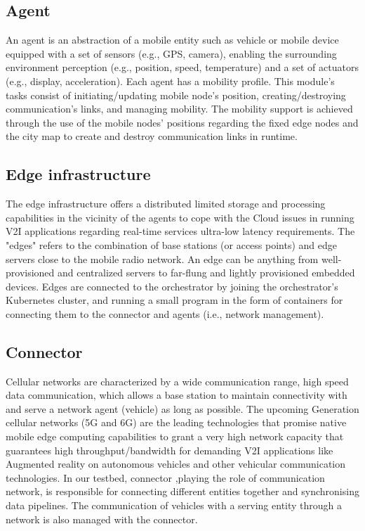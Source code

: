 \documentclass[conference]{IEEEtran}
\begin{document}
\subsection{Agent}
\par An agent is an abstraction of a mobile entity such as vehicle or mobile device equipped with a set of sensors (e.g., GPS, camera), enabling the surrounding environment perception (e.g., position, speed, temperature) and a set of actuators (e.g., display, acceleration). Each agent has a mobility profile. This module's tasks consist of initiating/updating mobile node's position, creating/destroying communication's links, and managing mobility.
The mobility support is achieved through the use of the mobile nodes' positions regarding the fixed edge nodes and the city map to create and destroy communication links in runtime.
\subsection{Edge infrastructure}
\par The edge infrastructure offers a distributed limited storage and processing capabilities in the vicinity of the agents to cope with the Cloud issues in running V2I applications regarding real-time services ultra-low latency requirements. The "edges" refers to the combination of base stations (or access points) and edge servers close to the mobile radio network. An edge can be anything from well-provisioned and centralized servers to far-flung and lightly provisioned embedded devices. Edges are connected to the orchestrator by joining the orchestrator's Kubernetes cluster, and running a small program in the form of containers for connecting them to the connector and agents (i.e., network management).
\subsection{Connector} 
\par Cellular networks are characterized by a wide communication range, high speed data communication, which allows a base station to maintain connectivity with and serve a network agent (vehicle) as long as possible. The upcoming Generation cellular networks (5G and 6G) are the leading technologies that promise native mobile edge computing capabilities\cite{slawomir2017next} to grant a very high network capacity that guarantees high throughput/bandwidth for demanding V2I applications like Augmented reality on autonomous vehicles and other vehicular communication technologies\cite{cheriftestbed}. In our testbed, connector ,playing the role of communication network, is responsible for connecting different entities together and synchronising data pipelines. The communication of vehicles with a serving entity through a network is also managed with the connector.
\end{document}
